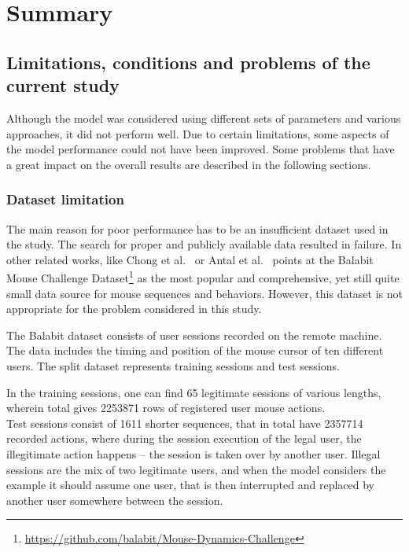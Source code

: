 \chapter{Summary}\label{ch:summary}


\section{Limitations, conditions and problems of the current study}\label{sec:limitations-conditions-problems}
Although the model was considered using different sets of parameters and various approaches, it did not perform well.
Due to certain limitations, some aspects of the model performance could not have been improved.
Some problems that have a great impact on the overall results are described in the following sections.

\subsection{Dataset limitation}\label{subsec:dataset-limitation}
The main reason for poor performance has to be an insufficient dataset used in the study.
The search for proper and publicly available data resulted in failure.
In other related works, like Chong et al.~\cite{Main} or Antal et al.~\cite{balabit1} points at the Balabit Mouse Challenge Dataset\footnote{\url{https://github.com/balabit/Mouse-Dynamics-Challenge}} as the most popular and comprehensive, yet still quite small data source for mouse sequences and behaviors.
However, this dataset is not appropriate for the problem considered in this study.

The Balabit dataset consists of user sessions recorded on the remote machine.
The data includes the timing and position of the mouse cursor of ten different users.
The split dataset represents training sessions and test sessions.

In the training sessions, one can find \num{65} legitimate sessions of various lengths, wherein total gives \num{2253871} rows of registered user mouse actions.\\
Test sessions consist of \num{1611} shorter sequences, that in total have \num{2357714} recorded actions, where during the session execution of the legal user, the illegitimate action happens – the session is taken over by another user. Illegal sessions are the mix of two legitimate users, and when the model considers the example it should assume one user, that is then interrupted and replaced by another user somewhere between the session.

